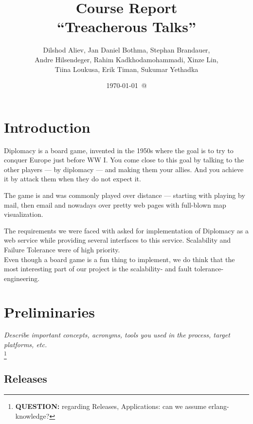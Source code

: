 \documentclass[11pt,a4paper]{report}
\newcommand{\hi}[1]{{\color{red}\em #1\/}\\}
\newcommand{\ask}[1]{\footnote{{\color{red} {\bf QUESTION:} #1}}}
\begin{document}
\title{Course Report \\
  ``Treacherous Talks''}
\date{\today\ @ \currenttime}
\author{Dilshod Aliev, Jan Daniel Bothma, Stephan Brandauer,\\
 Andre Hilsendeger, Rahim Kadkhodamohammadi, Xinze Lin,\\
Tiina Loukusa, Erik Timan, Sukumar Yethadka}
\maketitle
\tableofcontents


\chapter{Introduction}
Diplomacy is a board game, invented in the 1950s where the goal is to try to 
conquer Europe just before WW I. You come close to this goal by talking to the
other players --- by diplomacy --- and making them your allies. And you achieve
it by attack them when they do not expect it.

The game is and was commonly played over distance --- starting with playing by 
mail, then email and nowadays over pretty web pages with full-blown map
visualization.

The requirements we were faced with asked for implementation of Diplomacy as a
web service while providing several interfaces to this service. Scalability and
Failure Tolerance were of high priority. \\
Even though a board game is a fun thing to implement, we do think that the most
interesting part of our project is the scalability- and fault tolerance-
engineering.

\chapter{Preliminaries}
\hi{Describe important concepts, acronyms, tools you used in the process, target platforms, etc.}
\ask{regarding Releases, Applications: can we assume erlang-knowledge?}
\section{Releases}
\end{document}
